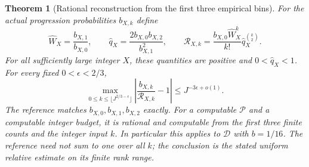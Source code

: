 \documentclass[11pt]{article}
\newtheorem{theorem}{Theorem}[section]
\theoremstyle{definition}
\begin{document}
\begin{theorem}[Rational reconstruction from the first three empirical bins]
\label{thm:three-bin-rational-reconstruction}
For the actual progression probabilities $b_{X,k}$ define
\begin{equation}
 \widehat W_X=\frac{b_{X,1}}{b_{X,0}},\qquad
 \widehat q_X=\frac{2b_{X,0}b_{X,2}}{b_{X,1}^2},\qquad
 \mathcal R_{X,k}
  =\frac{b_{X,0}\widehat W_X^k}{k!}
                              \widehat q_X^{\binom k2}.
 \label{eq:three-bin-rational-reference}
\end{equation}
For all sufficiently large integer $X$, these quantities are
positive and $0<\widehat q_X<1$.
For every fixed $0<\epsilon<2/3$,
\begin{equation}
 \max_{0\le k\le\lfloor J^{2/3-\epsilon}\rfloor}
       \left|\frac{b_{X,k}}{\mathcal R_{X,k}}-1\right|
        \le J^{-3\epsilon+o(1)}.
 \label{eq:three-bin-relative-window}
\end{equation}
The reference matches $b_{X,0},b_{X,1},b_{X,2}$ exactly.
For a computable $\mathcal P$ and a computable integer budget,
it is rational and computable from the first three finite counts
and the integer input $k$.
In particular this applies to $\mathcal D$ with $b=1/16$.
The reference need not sum to one over all $k$; the conclusion
is the stated uniform relative estimate on its finite rank range.
\end{theorem}
\end{document}
